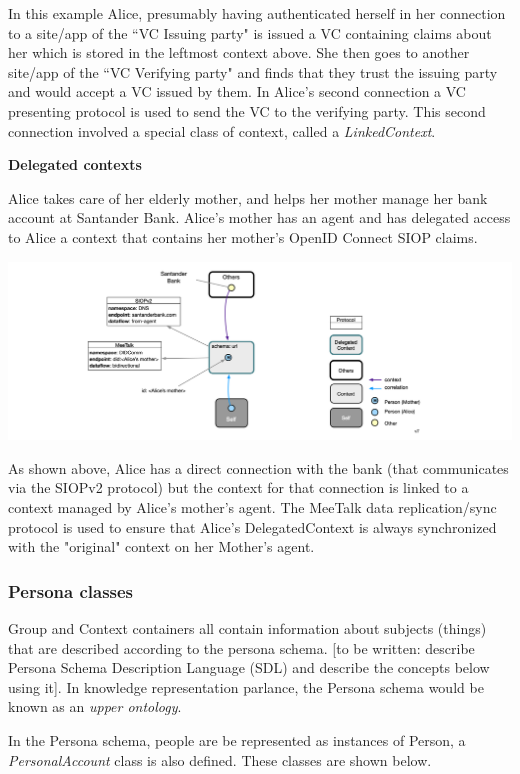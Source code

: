 \documentclass[11pt, oneside]{article}   	%
\begin{document}
In this example Alice, presumably having authenticated herself in her connection to a site/app of the ``VC Issuing party" is issued a VC containing claims about her which is stored in the leftmost context above. She then goes to another site/app of the ``VC Verifying party" and finds that they trust the issuing party and would accept a VC issued by them. In Alice's second connection a VC presenting protocol is used to send the VC to the verifying party. This second connection involved a special class of context, called a \emph{LinkedContext}. 

\textbf{Delegated contexts}

Alice takes care of her elderly mother, and helps her mother manage her bank account at Santander Bank. Alice's mother has an agent and has delegated access to Alice a context that contains her mother's OpenID Connect SIOP claims. 

\includegraphics[width=\textwidth]{./images/delegated-contexts.png}

As shown above, Alice has a direct connection with the bank (that communicates via the SIOPv2 protocol) but the context for that connection is linked to a context managed by Alice's mother's agent. The MeeTalk data replication/sync protocol is used to ensure that Alice's DelegatedContext is always synchronized with the "original" context on her Mother's agent.

\subsubsection{Persona classes}

Group and Context containers all contain information about subjects (things) that are described according to the persona schema. [to be written: describe Persona Schema Description Language (SDL) and describe the concepts below using it]. In knowledge representation parlance, the Persona schema would be known as an \emph{upper ontology}.

In the Persona schema, people are be represented as instances of Person, a \emph{PersonalAccount} class is also defined. These classes are shown below. 
\end{document}
